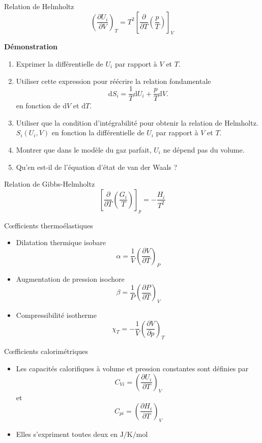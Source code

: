\documentclass[
  ignorenonframetext,
]{beamer}
\providecommand{\tightlist}{%
  \setlength{\itemsep}{0pt}\setlength{\parskip}{0pt}}
\begin{document}
\begin{frame}{Relation de Helmholtz}
\protect\hypertarget{relation-de-helmholtz}{}
\[
\left ( \frac{\partial U _ i}{\partial V} \right ) _ T = T ^ 2 \left [ \frac{\partial}{\partial T} \left ( \frac{p}{T} \right ) \right ] _ V
\]

\textbf{Démonstration}

\begin{enumerate}
\tightlist
\item
  Exprimer la différentielle de \(U _ i\) par rapport à \(V\) et \(T\).
\item
  Utiliser cette expression pour réécrire la relation fondamentale \[
  \mathrm{d} S _ i = \frac{1}{T} \mathrm{d} U _ i + \frac{p}{T} \mathrm{d} V.
  \] en fonction de \(\mathrm{d} V\) et \(\mathrm{d} T\).
\item
  Utiliser que la condition d'intégrabilité pour obtenir la relation de
  Helmholtz. \(S _ i \left ( U _ i, V \right )\) en fonction la
  différentielle de \(U _ i\) par rapport à \(V\) et \(T\).
\item
  Montrer que dans le modèle du gaz parfait, \(U _ i\) ne dépend pas du
  volume.
\item
  Qu'en est-il de l'équation d'état de van der Waals ?
\end{enumerate}
\end{frame}

\begin{frame}{Relation de Gibbs-Helmholtz}
\protect\hypertarget{relation-de-gibbs-helmholtz}{}
\[
\left [ \frac{\partial}{\partial T} \left ( \frac{G _ i}{T} \right ) \right ] _ p = - \frac{H _ i}{T ^ 2}
\]
\end{frame}

\begin{frame}{Cœfficients thermoélastiques}
\protect\hypertarget{cux153fficients-thermouxe9lastiques}{}
\begin{itemize}
\tightlist
\item
  Dilatation thermique isobare \[
  \alpha = \frac{1}{V} \left ( \frac{\partial V}{\partial T} \right ) _ P
  \]
\item
  Augmentation de pression isochore \[
  \beta = \frac{1}{P} \left ( \frac{\partial P}{\partial T} \right ) _ V
  \]
\item
  Compressibilité isotherme \[
  \chi _ T = - \frac{1}{V} \left ( \frac{\partial V}{\partial p} \right ) _ T
  \]
\end{itemize}
\end{frame}

\begin{frame}{Cœfficients calorimétriques}
\protect\hypertarget{cux153fficients-calorimuxe9triques}{}
\begin{itemize}
\tightlist
\item
  Les capacités calorifiques à volume et pression constantes sont
  définies par \[
  C _ {V i} = \left ( \frac{\partial U _ i}{\partial T} \right ) _ V
  \] et \[
  C _ {p i} = \left ( \frac{\partial H _ i}{\partial T} \right ) _ V
  \]
\item
  Elles s'expriment toutes deux en \(\si{\joule\per\kelvin\per\mole}\)
\end{itemize}
\end{frame}
\end{document}
